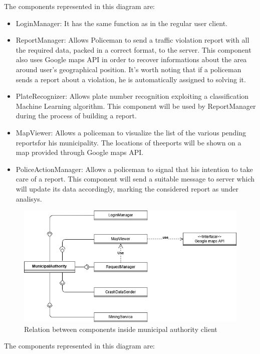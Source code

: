 The components represented in this diagram are:
\begin{itemize}
	\item LoginManager: It has the same function as in the regular user client.
	\item ReportManager: Allows Policeman to send a traffic violation report with all the required data, packed in a correct format, to the server.
	This component also uses Google maps API in order to recover informations about the area around user's geographical position.\newline
	It's worth noting that if a policeman sends a report about a violation, he is automatically assigned to solving it.
	\item PlateRecognizer: Allows plate number recognition exploiting a classification Machine Learning algorithm. This component will be used by ReportManager during the process of building a report.
	\item MapViewer: Allows a policeman to visualize the list of the various pending reportsfor his municipality.
	The locations of theeports will be shown on a map provided through Google maps API.
	\item PoliceActionManager: Allows a policeman to signal that his intention to take care of a report. This component will send a suitable message to server which will update its data accordingly, marking the considered report as under analisys.
	
\end{itemize}
\newpage
\begin{figure}[H]
	\centering
	\includegraphics[scale=0.7]{Images/MunicipalAuthorityClient}
	\caption{Relation between components inside municipal authority client}
\end{figure}
The components represented in this diagram are:
